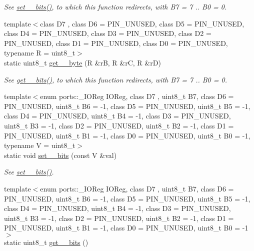 \begin{DoxyCompactItemize}
\begin{DoxyCompactList}\small\item\em See \hyperlink{namespaceports_aac15fb87d8fede3f2bf8d764ab42965f}{set\+\_\+\_\+bits()}, to which this function redirects, with {\ttfamily B7 = 7} .. {\ttfamily B0 = 0}. \end{DoxyCompactList}\item 
{\footnotesize template$<$class D7 , class D6  = P\+I\+N\+\_\+\+U\+N\+U\+S\+ED, class D5  = P\+I\+N\+\_\+\+U\+N\+U\+S\+ED, class D4  = P\+I\+N\+\_\+\+U\+N\+U\+S\+ED, class D3  = P\+I\+N\+\_\+\+U\+N\+U\+S\+ED, class D2  = P\+I\+N\+\_\+\+U\+N\+U\+S\+ED, class D1  = P\+I\+N\+\_\+\+U\+N\+U\+S\+ED, class D0  = P\+I\+N\+\_\+\+U\+N\+U\+S\+ED, typename R  = uint8\+\_\+t$>$ }\\static uint8\+\_\+t \hyperlink{namespaceports_ae7d1ffc9ed6454ca61b006ffe43e4e6e}{get\+\_\+\_\+byte} (R \&rB, R \&rC, R \&rD)
\begin{DoxyCompactList}\small\item\em See \hyperlink{namespaceports_a9a1959ec95780c00a964b174a27b2a37}{get\+\_\+\_\+bits()}, to which this function redirects, with {\ttfamily B7 = 7} .. {\ttfamily B0 = 0}. \end{DoxyCompactList}\item 
{\footnotesize template$<$enum ports\+::\+\_\+\+I\+O\+Reg I\+O\+Reg, class D7 , uint8\+\_\+t B7, class D6  = P\+I\+N\+\_\+\+U\+N\+U\+S\+ED, uint8\+\_\+t B6 = -\/1, class D5  = P\+I\+N\+\_\+\+U\+N\+U\+S\+ED, uint8\+\_\+t B5 = -\/1, class D4  = P\+I\+N\+\_\+\+U\+N\+U\+S\+ED, uint8\+\_\+t B4 = -\/1, class D3  = P\+I\+N\+\_\+\+U\+N\+U\+S\+ED, uint8\+\_\+t B3 = -\/1, class D2  = P\+I\+N\+\_\+\+U\+N\+U\+S\+ED, uint8\+\_\+t B2 = -\/1, class D1  = P\+I\+N\+\_\+\+U\+N\+U\+S\+ED, uint8\+\_\+t B1 = -\/1, class D0  = P\+I\+N\+\_\+\+U\+N\+U\+S\+ED, uint8\+\_\+t B0 = -\/1, typename V  = uint8\+\_\+t$>$ }\\static void \hyperlink{namespaceports_ac9262ca010e65ff684986eef2900942f}{set\+\_\+\_\+bits} (const V \&val)
\begin{DoxyCompactList}\small\item\em See \hyperlink{namespaceports_aac15fb87d8fede3f2bf8d764ab42965f}{set\+\_\+\_\+bits()}. \end{DoxyCompactList}\item 
{\footnotesize template$<$enum ports\+::\+\_\+\+I\+O\+Reg I\+O\+Reg, class D7 , uint8\+\_\+t B7, class D6  = P\+I\+N\+\_\+\+U\+N\+U\+S\+ED, uint8\+\_\+t B6 = -\/1, class D5  = P\+I\+N\+\_\+\+U\+N\+U\+S\+ED, uint8\+\_\+t B5 = -\/1, class D4  = P\+I\+N\+\_\+\+U\+N\+U\+S\+ED, uint8\+\_\+t B4 = -\/1, class D3  = P\+I\+N\+\_\+\+U\+N\+U\+S\+ED, uint8\+\_\+t B3 = -\/1, class D2  = P\+I\+N\+\_\+\+U\+N\+U\+S\+ED, uint8\+\_\+t B2 = -\/1, class D1  = P\+I\+N\+\_\+\+U\+N\+U\+S\+ED, uint8\+\_\+t B1 = -\/1, class D0  = P\+I\+N\+\_\+\+U\+N\+U\+S\+ED, uint8\+\_\+t B0 = -\/1$>$ }\\static uint8\+\_\+t \hyperlink{namespaceports_a2a0a17506421aaa10b7c087124a09b72}{get\+\_\+\_\+bits} ()

\end{DoxyCompactItemize}
